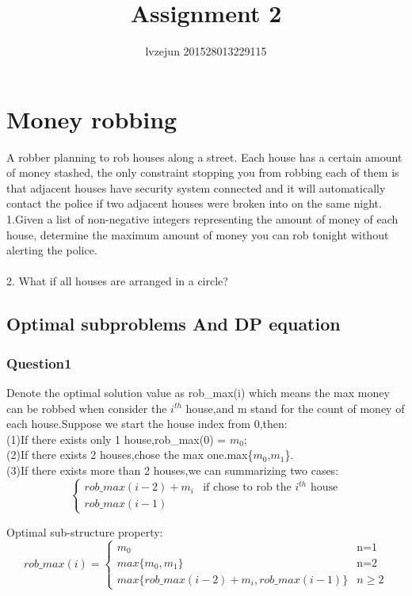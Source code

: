 \documentclass[]{article}
\title{Assignment 2}
\author{lvzejun 201528013229115}
\begin{document}
\maketitle
\tableofcontents
\newpage

\section{Money robbing}
A robber planning to rob houses along a street. Each house has a certain
amount of money stashed, the only constraint stopping you from robbing
each of them is that adjacent houses have security system connected and
it will automatically contact the police if two adjacent houses were broken
into on the same night.\\

1.Given a list of non-negative integers representing the amount of money
of each house, determine the maximum amount of money you can rob
tonight without alerting the police.\\\\
2. What if all houses are arranged in a circle?
\subsection{Optimal subproblems And DP equation}
\subsubsection{Question1}
Denote the optimal solution value as rob\_max(i) which means the max money can be robbed when consider the $i^{th}$ house,and m stand for the count of money of each house.Suppose we start the house index from 0,then:\\
(1)If there exists only 1 house,rob\_max(0) = $m_0$;\\
(2)If there exists 2 houses,chose the max one.max\{$m_0$,$m_1$\}.\\
(3)If there exists more than 2 houses,we can summarizing two cases:\\

$$
\begin{cases}
rob\_max(i-2)+ m_i&  \text{if chose to rob the $i^{th}$ house} \\
rob\_max(i-1) &
\end{cases}
$$

Optimal sub-structure property:\\
$$
rob\_max(i) = \begin{cases}
m_0 &  \text{n=1} \\
max\{m_0,m_1\} &  \text{n=2} \\
max\{rob\_max(i-2)+m_i,rob\_max(i-1)\}& \text{$n\geqslant2$} 
\end{cases}
$$
\end{document}
